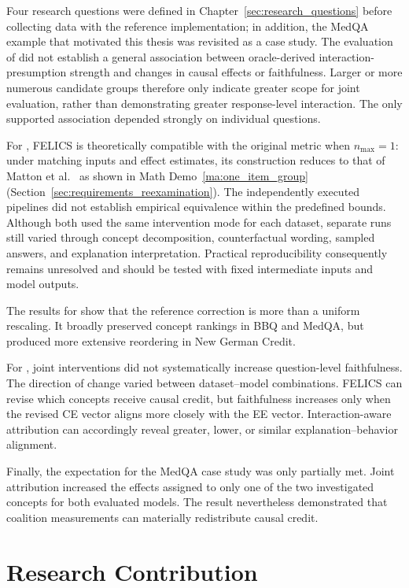 Four research questions were defined in Chapter~\ref{sec:research_questions} before collecting data with the reference implementation; in addition, the MedQA example that motivated this thesis was revisited as a case study. The evaluation of  did not establish a general association between oracle-derived interaction-presumption strength and changes in causal effects or faithfulness. Larger or more numerous candidate groups therefore only indicate greater scope for joint evaluation, rather than demonstrating greater response-level interaction. The only supported association depended strongly on individual questions.

For , FELICS is theoretically compatible with the original metric when $n_{\max}=1$: under matching inputs and effect estimates, its construction reduces to that of Matton et al.~\cite{mattonWalkTalkMeasuring2024} as shown in Math Demo~\ref{ma:one_item_group} (Section~\ref{sec:requirements_reexamination}). The independently executed pipelines did not establish empirical equivalence within the predefined bounds. Although both used the same intervention mode for each dataset, separate runs still varied through concept decomposition, counterfactual wording, sampled answers, and explanation interpretation. Practical reproducibility consequently remains unresolved and should be tested with fixed intermediate inputs and model outputs.

The results for  show that the reference correction is more than a uniform rescaling. It broadly preserved concept rankings in BBQ and MedQA, but produced more extensive reordering in New German Credit.

For , joint interventions did not systematically increase question-level faithfulness. The direction of change varied between dataset--model combinations. FELICS can revise which concepts receive causal credit, but faithfulness increases only when the revised CE vector aligns more closely with the EE vector. Interaction-aware attribution can accordingly reveal greater, lower, or similar explanation--behavior alignment.

Finally, the expectation for the MedQA case study was only partially met. Joint attribution increased the effects assigned to only one of the two investigated concepts for both evaluated models. The result nevertheless demonstrated that coalition measurements can materially redistribute causal credit.

\section{Research Contribution}

